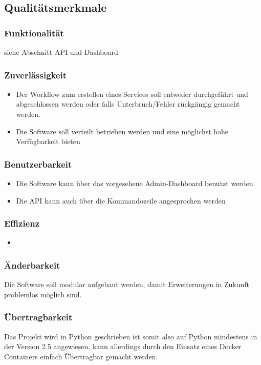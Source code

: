 \documentclass[11pt]{scrartcl}
\begin{document}
\subsection{Qualitätsmerkmale}
\subsubsection{Funktionalität}
siehe Abschnitt API und Dashboard
\subsubsection{Zuverlässigkeit}
\begin{itemize}
  \item Der Workflow zum erstellen eines Services soll entweder durchgeführt und 
  abgeschlossen werden oder falls Unterbruch/Fehler rückgängig gemacht 
  werden.
  \item Die Software soll verteilt betrieben werden und eine möglichst hohe 
  Verfügbarkeit bieten
\end{itemize}
\subsubsection{Benutzerbarkeit}
\begin{itemize}
  \item Die Software kann über das vorgesehene Admin-Dashboard benutzt werden
  \item Die API kann auch über die Kommandozeile angesprochen werden
\end{itemize}
\subsubsection{Effizienz}
\begin{itemize}
  \item 
\end{itemize}
\subsubsection{Änderbarkeit}
Die Software soll modular aufgebaut werden, damit Erweiterungen in Zukunft 
problemlos möglich sind.
\subsubsection{Übertragbarkeit}
Das Projekt wird in Python geschrieben ist somit also auf Python mindestens in der Version 2.5 angewiesen, 
kann allerdings durch den Einsatz eines Docker Containers einfach Übertragbar 
gemacht werden.
\end{document}
